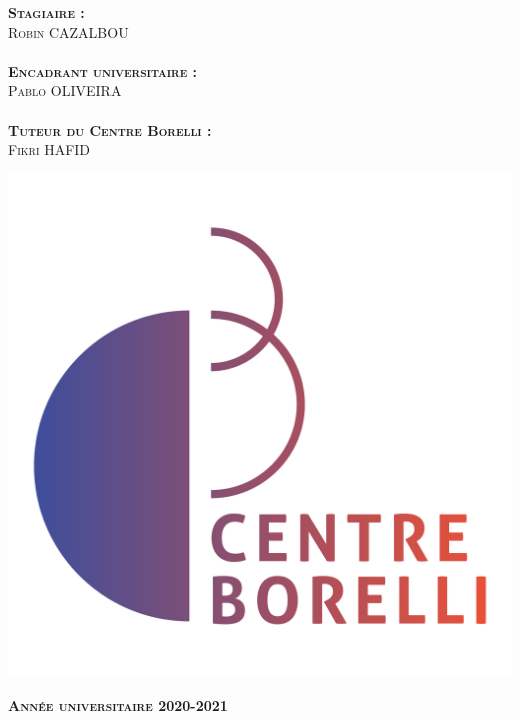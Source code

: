\documentclass[11pt,a4paper,oneside]{memoir}
\theoremstyle{definition}
\theoremstyle{remark}
\theoremstyle{plain}
\begin{document}

\begin{center}
	\Large
	\textsc{\textbf{Stagiaire :}}\\
	\textsc{Robin CAZALBOU}\\
	~ \\
	\textsc{\textbf{Encadrant universitaire :}}\\
	\textsc{Pablo OLIVEIRA}\\
	~ \\
	\textsc{\textbf{Tuteur du Centre Borelli :}}\\
	\textsc{Fikri HAFID}\\
\end{center}

\begin{center}
\includegraphics[scale=0.22]{./Images-Rapport/logo_centre_borelli.png}
\end{center}


\begin{center}
\textsc{\textbf{Année universitaire 2020-2021}}
\end{center}

\end{document}
